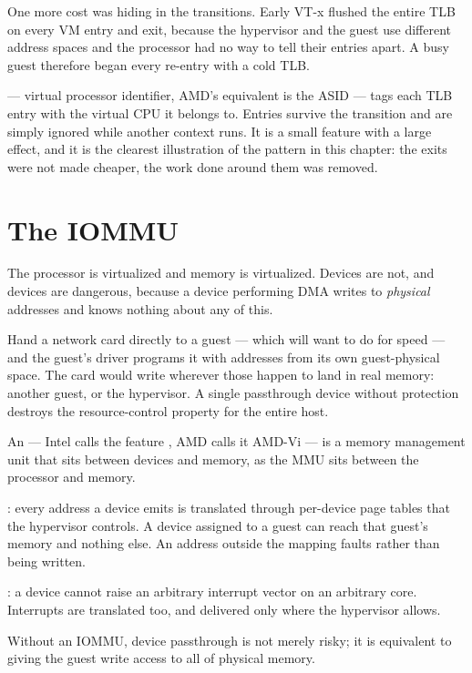 \begin{conceptbox}
One more cost was hiding in the transitions. Early VT-x flushed the entire TLB
on every VM entry and exit, because the hypervisor and the guest use different
address spaces and the processor had no way to tell their entries apart. A busy
guest therefore began every re-entry with a cold TLB.

\smallskip
{} --- virtual processor identifier, AMD's equivalent is the ASID ---
tags each TLB entry with the virtual CPU it belongs to. Entries survive the
transition and are simply ignored while another context runs. It is a small
feature with a large effect, and it is the clearest illustration of the
pattern in this chapter: the exits were not made cheaper, the work done around
them was removed.
\end{conceptbox}

\section{The IOMMU}

The processor is virtualized and memory is virtualized. Devices are not, and
devices are dangerous, because a device performing DMA writes to \emph{physical}
addresses and knows nothing about any of this.

Hand a network card directly to a guest --- which  will want to
do for speed --- and the guest's driver programs it with addresses from its own
guest-physical space. The card would write wherever those happen to land in
real memory: another guest, or the hypervisor. A single passthrough device
without protection destroys the resource-control property for the entire host.

\begin{definitionbox}
An  --- Intel calls the feature , AMD calls it AMD-Vi ---
is a memory management unit that sits between devices and memory, as the MMU
sits between the processor and memory.

\smallskip
{}: every address a device emits is translated through
per-device page tables that the hypervisor controls. A device assigned to a
guest can reach that guest's memory and nothing else. An address outside the
mapping faults rather than being written.

\smallskip
{}: a device cannot raise an arbitrary interrupt vector
on an arbitrary core. Interrupts are translated too, and delivered only where
the hypervisor allows.

\smallskip
Without an IOMMU, device passthrough is not merely risky; it is equivalent to
giving the guest write access to all of physical memory.
\end{definitionbox}

